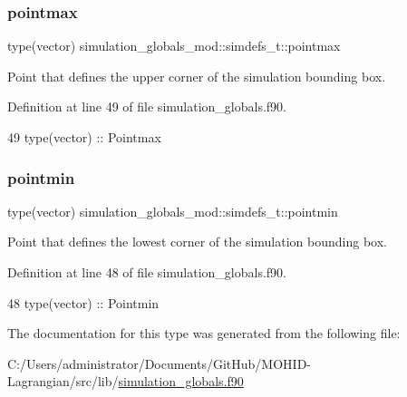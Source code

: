 \subsubsection{\texorpdfstring{pointmax}{pointmax}}
{\footnotesize\ttfamily type(vector) simulation\+\_\+globals\+\_\+mod\+::simdefs\+\_\+t\+::pointmax\hspace{0.3cm}{\ttfamily [private]}}



Point that defines the upper corner of the simulation bounding box. 



Definition at line 49 of file simulation\+\_\+globals.\+f90.


\begin{DoxyCode}
49         \textcolor{keywordtype}{type}(vector)    ::  Pointmax
\end{DoxyCode}
\mbox{\label{structsimulation__globals__mod_1_1simdefs__t_af3a5fb325c955840515f199c8be30aa7}} 
\subsubsection{\texorpdfstring{pointmin}{pointmin}}
{\footnotesize\ttfamily type(vector) simulation\+\_\+globals\+\_\+mod\+::simdefs\+\_\+t\+::pointmin\hspace{0.3cm}{\ttfamily [private]}}



Point that defines the lowest corner of the simulation bounding box. 



Definition at line 48 of file simulation\+\_\+globals.\+f90.


\begin{DoxyCode}
48         \textcolor{keywordtype}{type}(vector)    ::  Pointmin
\end{DoxyCode}


The documentation for this type was generated from the following file\+:\begin{DoxyCompactItemize}
\item 
C\+:/\+Users/administrator/\+Documents/\+Git\+Hub/\+M\+O\+H\+I\+D-\/\+Lagrangian/src/lib/\mbox{\hyperlink{simulation__globals_8f90}{simulation\+\_\+globals.\+f90}}\end{DoxyCompactItemize}
